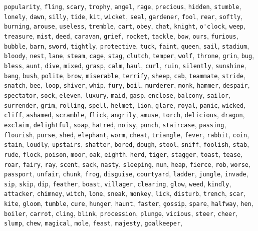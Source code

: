 \verb|popularity|, \verb|fling|, \verb|scary|, \verb|trophy|, \verb|angel|, \verb|rage|, \verb|precious|, \verb|hidden|, \verb|stumble|, \verb|lonely|, \verb|dawn|, \verb|silly|, \verb|tide|, \verb|kit|, \verb|wicket|, \verb|seal|, \verb|gardener|, \verb|fool|, \verb|rear|, \verb|softly|, \verb|burning|, \verb|arouse|, \verb|useless|, \verb|tremble|, \verb|cart|, \verb|obey|, \verb|chat|, \verb|knight|, \verb|o'clock|, \verb|weep|, \verb|treasure|, \verb|mist|, \verb|deed|, \verb|caravan|, \verb|grief|, \verb|rocket|, \verb|tackle|, \verb|bow|, \verb|ours|, \verb|furious|, \verb|bubble|, \verb|barn|, \verb|sword|, \verb|tightly|, \verb|protective|, \verb|tuck|, \verb|faint|, \verb|queen|, \verb|sail|, \verb|stadium|, \verb|bloody|, \verb|nest|, \verb|lane|, \verb|steam|, \verb|cage|, \verb|stag|, \verb|clutch|, \verb|temper|, \verb|wolf|, \verb|throne|, \verb|grin|, \verb|bug|, \verb|bless|, \verb|aunt|, \verb|dive|, \verb|mixed|, \verb|grasp|, \verb|calm|, \verb|haul|, \verb|curl|, \verb|ruin|, \verb|silently|, \verb|sunshine|, \verb|bang|, \verb|bush|, \verb|polite|, \verb|brow|, \verb|miserable|, \verb|terrify|, \verb|sheep|, \verb|cab|, \verb|teammate|, \verb|stride|, \verb|snatch|, \verb|bee|, \verb|loop|, \verb|shiver|, \verb|whip|, \verb|fury|, \verb|boil|, \verb|murderer|, \verb|monk|, \verb|hammer|, \verb|despair|, \verb|spectator|, \verb|sock|, \verb|eleven|, \verb|luxury|, \verb|maid|, \verb|gasp|, \verb|enclose|, \verb|balcony|, \verb|sailor|, \verb|surrender|, \verb|grim|, \verb|rolling|, \verb|spell|, \verb|helmet|, \verb|lion|, \verb|glare|, \verb|royal|, \verb|panic|, \verb|wicked|, \verb|cliff|, \verb|ashamed|, \verb|scramble|, \verb|flick|, \verb|angrily|, \verb|amuse|, \verb|torch|, \verb|delicious|, \verb|dragon|, \verb|exclaim|, \verb|delightful|, \verb|soap|, \verb|hatred|, \verb|noisy|, \verb|punch|, \verb|staircase|, \verb|passing|, \verb|flourish|, \verb|purse|, \verb|shed|, \verb|elephant|, \verb|worm|, \verb|cheat|, \verb|triangle|, \verb|fever|, \verb|rabbit|, \verb|coin|, \verb|stain|, \verb|loudly|, \verb|upstairs|, \verb|shatter|, \verb|bored|, \verb|dough|, \verb|stool|, \verb|sniff|, \verb|foolish|, \verb|stab|, \verb|rude|, \verb|flock|, \verb|poison|, \verb|moor|, \verb|oak|, \verb|eighth|, \verb|herd|, \verb|tiger|, \verb|stagger|, \verb|toast|, \verb|tease|, \verb|roar|, \verb|fairy|, \verb|ray|, \verb|scent|, \verb|sack|, \verb|nasty|, \verb|sleeping|, \verb|nun|, \verb|heap|, \verb|fierce|, \verb|rob|, \verb|worse|, \verb|passport|, \verb|unfair|, \verb|chunk|, \verb|frog|, \verb|disguise|, \verb|courtyard|, \verb|ladder|, \verb|jungle|, \verb|invade|, \verb|sip|, \verb|skip|, \verb|dip|, \verb|feather|, \verb|boast|, \verb|villager|, \verb|clearing|, \verb|glow|, \verb|weed|, \verb|kindly|, \verb|attacker|, \verb|chimney|, \verb|witch|, \verb|lone|, \verb|sneak|, \verb|monkey|, \verb|lick|, \verb|disturb|, \verb|trench|, \verb|scar|, \verb|kite|, \verb|gloom|, \verb|tumble|, \verb|cure|, \verb|hunger|, \verb|haunt|, \verb|faster|, \verb|gossip|, \verb|spare|, \verb|halfway|, \verb|hen|, \verb|boiler|, \verb|carrot|, \verb|cling|, \verb|blink|, \verb|procession|, \verb|plunge|, \verb|vicious|, \verb|steer|, \verb|cheer|, \verb|slump|, \verb|chew|, \verb|magical|, \verb|mole|, \verb|feast|, \verb|majesty|, \verb|goalkeeper|, 